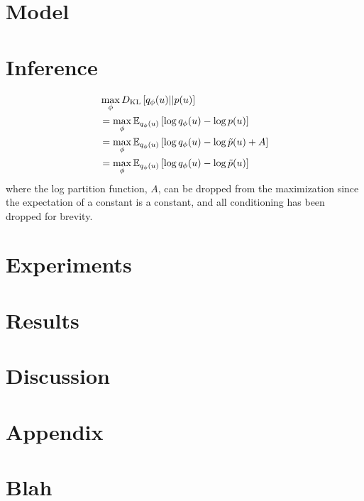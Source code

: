 \documentclass[11pt,a4paper]{article}
\newcommand\qphi{q_\phi}
\begin{document}
\section{Model}

\section{Inference}
\begin{equation}
\begin{aligned}
&\max_\phi \KL{\qphi(u) || p(u)}\\
&= \max_\phi \Es{\qphi(u)}{\log \qphi(u) - \log p(u)}\\
&= \max_\phi \Es{\qphi(u)}{\log \qphi(u) - \log \tilde{p}(u) + A}\\
&= \max_\phi \Es{\qphi(u)}{\log \qphi(u) - \log \tilde{p}(u)}
\end{aligned}
\end{equation}
where the log partition function, $A$, can be dropped from the maximization
since the expectation of a constant is a constant,
and all conditioning has been dropped for brevity.

\section{Experiments}
\subsection{}
\subsection{}
\subsection{}

\section{Results}

\section{Discussion}




\appendix

\section*{Appendix}
\section{Blah}
   
\end{document}
